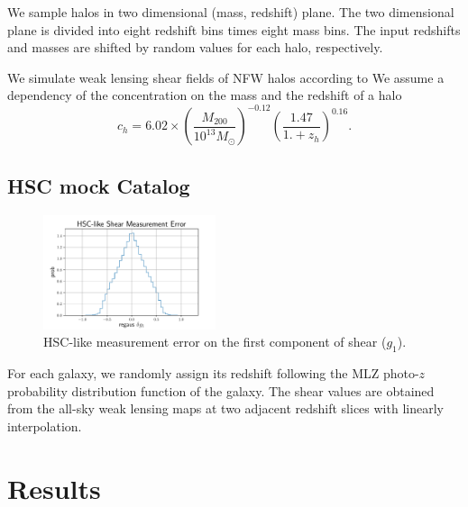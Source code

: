 \documentclass[twocolumn]{aastex62}
\begin{document}
We sample halos in two dimensional (mass, redshift) plane. The two dimensional plane is divided into eight redshift bins 
times eight mass bins. The input redshifts and masses are shifted by random values for each halo, respectively.

We simulate weak lensing shear fields of NFW halos according to \citet{haloModel-TJ2003-3pt}
We assume a dependency of the concentration on the mass and the redshift of a halo 
\citet[equation (2)]{c-M_Magneticum-Ragagnin2019}
\begin{equation}
c_{h}=6.02\times(\frac{M_{200}}{10^{13} M_{\odot}})^{-0.12}(\frac{1.47}{1.+z_h})^{0.16}.
\end{equation}

\subsection{HSC mock Catalog}
\begin{figure}[!ht]
 \centering
 \includegraphics[width=0.45\textwidth]{shapeMeasurementError-HSCY1.pdf}
 \caption{HSC-like measurement error on the first component of shear ($g_1$).}
 \label{fig:mass-redshift}
\end{figure}

For each galaxy, we randomly assign its redshift following the MLZ photo-$z$ probability distribution function 
\citep{HSC1-photoz} of the galaxy. The shear values are obtained from the all-sky weak lensing maps at two adjacent 
redshift slices with linearly interpolation.

\section{Results}
\label{sec:Res}
\end{document}
